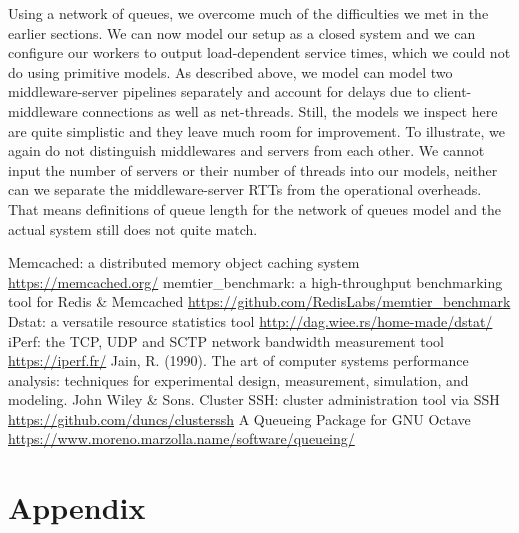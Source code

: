 \documentclass[11pt,a4paper]{article}
\begin{document}
\par Using a network of queues, we overcome much of the difficulties we met in the earlier sections. We can now model our setup as a closed system and we can configure our workers to output load-dependent service times, which we could not do using primitive models. As described above, we model can model two middleware-server pipelines separately and account for delays due to client-middleware connections as well as net-threads. Still, the models we inspect here are quite simplistic and they leave much room for improvement. To illustrate, we again do not distinguish middlewares and servers from each other. We cannot input the number of servers or their number of threads into our models, neither can we separate the middleware-server RTTs from the operational overheads. That means definitions of queue length for the network of queues model and the actual system still does not quite match.

\clearpage
\begin{thebibliography}{9}
 Memcached: a distributed memory object caching system \url{https://memcached.org/}
 memtier\_benchmark: a high-throughput benchmarking tool for Redis \& Memcached \url{https://github.com/RedisLabs/memtier\_benchmark}
 Dstat: a versatile resource statistics tool \url{http://dag.wiee.rs/home-made/dstat/}
 iPerf: the TCP, UDP and SCTP network bandwidth measurement tool \url{https://iperf.fr/}
 Jain, R. (1990). The art of computer systems performance analysis: techniques for experimental design, measurement, simulation, and modeling. John Wiley \& Sons.
 Cluster SSH: cluster administration tool via SSH \url{https://github.com/duncs/clusterssh}
 A Queueing Package for GNU Octave \url{https://www.moreno.marzolla.name/software/queueing/}
\end{thebibliography}

\clearpage
\section*{Appendix} \label{sec:appendix}
\end{document}
